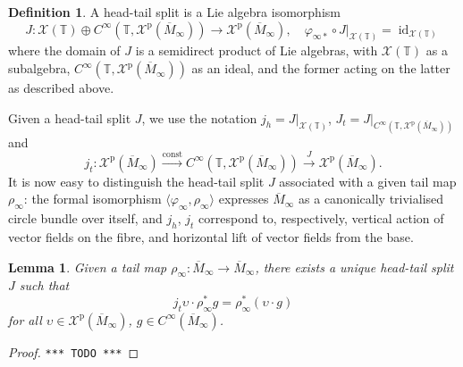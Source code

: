\documentclass{article}
\def\MISS{\texttt{*** TODO ***}}
\def\TT{\mathbb{T}}
\def\XX{\mathscr{X}}
\DeclareMathOperator{\id}{\mathrm{id}}
\def\p{\mathrm{p}}
\newtheorem{lem}{Lemma}
\theoremstyle{definition}
\newtheorem{defn}{Definition}
\begin{document}
\begin{defn}
A head-tail split is a Lie algebra isomorphism
$$
J : \XX(\TT) \oplus C^\infty(\TT, \XX^\p(\overline M_\infty)) \to \XX^\p(\overline M_\infty),\quad
        \varphi_{\infty*}\circ J|_{\XX(\TT)} = \id_{\XX(\TT)}
$$
where the domain of $J$ is a semidirect product of Lie algebras, with 
        $\XX(\TT)$ as a subalgebra, $C^\infty(\TT,\XX^\p(\overline M_\infty))$ as an ideal,
        and the former acting on the latter as described above. 
\end{defn}
Given a head-tail split $J$, we use the notation $ j_h=J|_{\XX(\TT)}$,
$J_t = J|_{C^\infty(\TT,\XX^\p(\overline M_\infty))}$
and $$ j_t : \XX^\p(\overline M_\infty)\xrightarrow{\mathrm{const}}C^\infty(\TT,\XX^\p(\overline M_\infty))
\xrightarrow{J} \XX^\p(\overline M_\infty).$$
It is now easy to distinguish the head-tail split $J$
associated with a given tail map $\rho_\infty$:
the formal isomorphism $\langle \varphi_\infty,\rho_\infty\rangle$
expresses $\overline M_\infty$
as a canonically trivialised circle bundle over itself,
and $j_h$, $j_t$
correspond to, respectively, vertical action of vector fields on the fibre, and
horizontal lift of vector fields from the base.
\begin{lem}\label{lem:hts}
        Given a tail map $\rho_\infty : \overline M_\infty \to \overline M_\infty$,
        there exists a unique head-tail split $J$
        such that $$ j_t \upsilon \cdot \rho_\infty^* g = \rho_\infty^* (\upsilon \cdot g)$$
        for all $\upsilon \in \XX^\p(\overline M_\infty)$, $g \in C^\infty(\overline M_\infty)$.
\end{lem}
\begin{proof}\MISS{}\end{proof}
\end{document}
